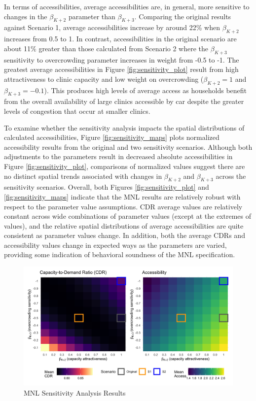 \documentclass[]{elsarticle} %
\begin{document}
In terms of accessibilities, average accessibilities are, in general,
more sensitive to changes in the \(\beta_{K+2}\) parameter than
\(\beta_{K+3}\). Comparing the original results against Scenario 1,
average accessibilities increase by around 22\% when \(\beta_{K+2}\)
increases from 0.5 to 1. In contrast, accessibilities in the original
scenario are about 11\% greater than those calculated from Scenario 2
where the \(\beta_{K+3}\) sensitivity to overcrowding parameter
increases in weight from -0.5 to -1. The greatest average
accessibilities in Figure \ref{fig:sensitivity_plot} result from high
attractiveness to clinic capacity and low weight on overcrowding
(\(\beta_{K+2} = 1\) and \(\beta_{K+3} = -0.1\)). This produces high
levels of average access as households benefit from the overall
availability of large clinics accessible by car despite the greater
levels of congestion that occur at smaller clinics.

To examine whether the sensitivity analysis impacts the spatial
distributions of calculated accessibilities, Figure
\ref{fig:sensitivity_maps} plots normalized accessibility results from
the original and two sensitivity scenarios. Although both adjustments to
the parameters result in decreased absolute accessibilities in Figure
\ref{fig:sensitivity_plot}, comparisons of normalized values suggest
there are no distinct spatial trends associated with changes in
\(\beta_{K + 2}\) and \(\beta_{K + 3}\) across the sensitivity
scenarios. Overall, both Figures \ref{fig:sensitivity_plot} and
\ref{fig:sensitivity_maps} indicate that the MNL results are relatively
robust with respect to the parameter value assumptions. CDR average
values are relatively constant across wide combinations of parameter
values (except at the extremes of values), and the relative spatial
distributions of average accessibilities are quite consistent as
parameter values change. In addition, both the average CDRs and
accessibility values change in expected ways as the parameters are
varied, providing some indication of behavioral soundness of the MNL
specification.

\begin{figure}
\includegraphics[width=1\linewidth]{./img/sensitivity_plot} \caption{\label{fig:sensitivity_plot}MNL Sensitivity Analysis Results}\label{fig:fig 8 sensitivity_tiles}
\end{figure}
\end{document}
